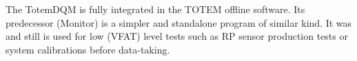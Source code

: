 
The TotemDQM is fully integrated in the TOTEM offline software. Its predecessor (Monitor) is a simpler and standalone program of similar kind. It was and still is used for low (VFAT) level tests such as RP sensor production tests or system calibrations before data-taking.
